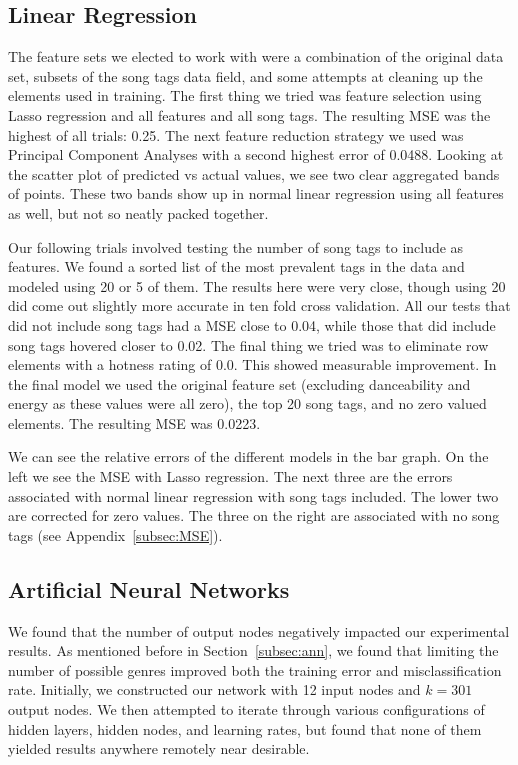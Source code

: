 \documentclass[12pt]{article}
\begin{document}
\subsection{Linear Regression}
\label{subsec:linearRegressionResults}
The feature sets we elected to work with were a combination of the original data set, subsets of the song tags data field, and some attempts at cleaning up the elements used in training. The first thing we tried was feature selection using Lasso regression and all features and all song tags. The resulting MSE was the highest of all trials: 0.25. The next feature reduction strategy we used was Principal Component Analyses with a second highest error of 0.0488. Looking at the scatter plot of predicted vs actual values, we see two clear aggregated bands of points. These two bands show up in normal linear regression using all features as well, but not so neatly packed together.

Our following trials involved testing the number of song tags to include as features. We found a sorted list of the most prevalent tags in the data and modeled using 20 or 5 of them. The results here were very close, though using 20 did come out slightly more accurate in ten fold cross validation. All our tests that did not include song tags had a MSE close to 0.04, while those that did include song tags hovered closer to 0.02. The final thing we tried was to eliminate row elements with a hotness rating of 0.0. This showed measurable improvement. In the final model we used the original feature set (excluding danceability and energy as these values were all zero), the top 20 song tags, and no zero valued elements. The resulting MSE was 0.0223.

We can see the relative errors of the different models in the bar graph. On the left we see the MSE with Lasso regression. The next three are the errors associated with normal linear regression with song tags included. The lower two are corrected for zero values. The three on the right are associated with no song tags (see Appendix~\ref{subsec:MSE}).

\subsection{Artificial Neural Networks}
\label{subsec:annResults}
We found that the number of output nodes negatively impacted our experimental results. As mentioned before in Section~\ref{subsec:ann}, we found that limiting the number of possible genres improved both the training error and misclassification rate. Initially, we constructed our network with 12 input nodes and $k = 301$ output nodes. We then attempted to iterate through various configurations of hidden layers, hidden nodes, and learning rates, but found that none of them yielded results anywhere remotely near desirable.
\end{document}
